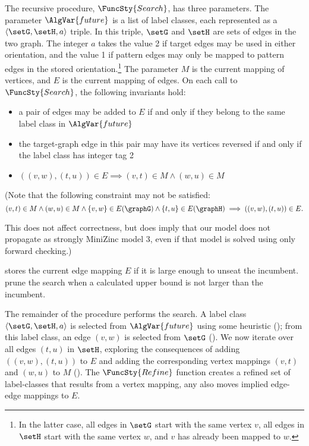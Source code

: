 The recursive procedure,
$\FuncSty{Search}$, has three parameters.  The parameter $\AlgVar{future}$ is a
list of label classes, each represented as a $\langle \setG, \setH, a\rangle$
triple.  In this triple, $\setG$ and $\setH$ are sets of edges in the two
graph.  The integer $a$ takes the value 2 if target edges may be used in either
orientation, and the value 1 if pattern edges may only be mapped to pattern
edges in the stored orientation.\footnote{In the latter case, all edges in
$\setG$ start with the same vertex $v$, all edges in $\setH$ start with the
same vertex $w$, and $v$ has already been mapped to $w$.}  The parameter $M$ is
the current mapping of vertices, and $E$ is the current mapping of edges.  On
each call to $\FuncSty{Search}$, the following invariants hold:

\begin{itemize}
    \item a pair of edges may be added to $E$ if and only if they belong to the same label class in $\AlgVar{future}$
    \item the target-graph edge in this pair may have its vertices reversed if and only if the label class has integer tag 2
    \item $((v,w),(t,u)) \in E \implies (v,t) \in M \wedge (w,u) \in M$ 
\end{itemize}

(Note that the following constraint may not be satisfied:
\[
(v,t) \in M \wedge (w,u) \in M \wedge \{v,w\} \in E(\graphG) \wedge \{t,u\} \in E(\graphH) \implies ((v,w),(t,u)) \in E.
\]

This does not affect correctness, but does imply that our model does not propagate as strongly MiniZinc model 3,
even if that model is solved using only forward checking.)

 stores the current edge mapping $E$ if it is large enough
to unseat the incumbent.   prune the
search when a calculated upper bound is not larger than the incumbent.

The remainder of the procedure performs the search.  A label class $\langle
\setG, \setH, a \rangle$ is selected from $\AlgVar{future}$ using some
heuristic (); from this label class, an edge $(v,w)$ is
selected from $\setG$ (). We now iterate over all edges
$(t,u)$ in $\setH$, exploring the consequences of adding $((v,w),(t,u))$ to $E$
and adding the corresponding vertex mappings $(v,t)$ and $(w,u)$ to $M$
().  The $\FuncSty{Refine}$ function
creates a refined set of label-classes that results from a vertex mapping,
any also moves implied edge-edge mappings to $E$.

